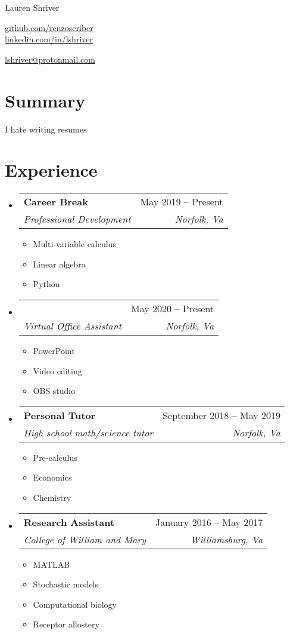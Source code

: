 \documentclass[letterpaper,10pt]{article}
\makeatletter
\newcommand{\resumeItem}[1]{
  \item\small{
    {#1 \vspace{-2pt}}
  }
}
\newcommand{\resumeSubheading}[4]{
  \vspace{-2pt}\item
    \begin{tabular*}{0.97\textwidth}[t]{l@{\extracolsep{\fill}}r}
      \textbf{#1} & #2 \\
      \textit{\small#3} & \textit{\small #4} \\
    \end{tabular*}\vspace{-7pt}
}
\newcommand{\resumeSubHeadingListStart}{\begin{itemize}[leftmargin=0.15in, label={}]}
\newcommand{\resumeSubHeadingListEnd}{\end{itemize}}
\newcommand{\resumeItemListStart}{\begin{itemize}}
\newcommand{\resumeItemListEnd}{\end{itemize}\vspace{-5pt}}
\makeatother
\begin{document}
\begin{center}
    {\LARGE Lauren Shriver} \\ \vspace{2pt}
    \begin{multicols}{2}
    \begin{flushleft}
    \href{{https://github.com/renzoscriber}}{github.com/renzoscriber}\\
    \href{{www.linkedin.com/in/lshriver}}{linkedin.com/in/lshriver}
    \end{flushleft}
    
    \begin{flushright}
    \href{mailto:{lshriver@protonmail.com}}{lshriver@protonmail.com}
    \end{flushright}
    \end{multicols}
\end{center}

\section{Summary}

I hate writing resumes

\section{Experience}
  \resumeSubHeadingListStart
    \resumeSubheading
      {Career Break}{May 2019 -- Present}
      {Professional Development}{Norfolk, Va}
      \resumeItemListStart
        \resumeItem{Multi-variable calculus}
        \resumeItem{Linear algebra}
        \resumeItem{Python}
    \resumeItemListEnd
    \resumeSubheading
      {}{May 2020 -- Present}{Virtual Office Assistant}{Norfolk, Va}
      \resumeItemListStart
        \resumeItem{PowerPoint}
        \resumeItem{Video editing}
        \resumeItem{OBS studio}
    \resumeItemListEnd
  \resumeSubHeadingListEnd
  \resumeSubHeadingListStart
        \resumeSubheading
      {Personal Tutor}{September 2018 -- May 2019}
      {High school math/science tutor}{Norfolk, Va}
      \resumeItemListStart
        \resumeItem{Pre-calculus}
        \resumeItem{Economics}
        \resumeItem{Chemistry}
    \resumeItemListEnd
  \resumeSubHeadingListEnd
  \resumeSubHeadingListStart
        \resumeSubheading
      {Research Assistant}{January 2016 -- May 2017}
      {College of William and Mary}{Williamsburg, Va}
      \resumeItemListStart
        \resumeItem{MATLAB}
        \resumeItem{Stochastic models}
        \resumeItem{Computational biology}
        \resumeItem{Receptor allostery}
    \resumeItemListEnd
    \resumeSubHeadingListEnd
    
\end{document}

